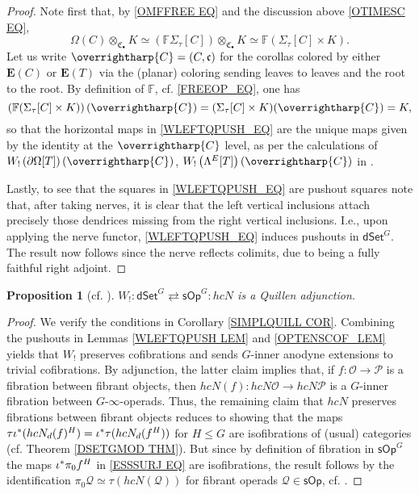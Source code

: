 \documentclass[a4paper,10pt
,draft
]{article}%
\numberwithin{equation}{section}
\numberwithin{figure}{section}
\newtheorem{proposition}[equation]{Proposition}%
\theoremstyle{definition} %
\newcommand{\vect}[1]{\text{\overrightharp{\ensuremath{#1}}}}
\newcommand{\sOp}{\ensuremath{\mathsf{sOp}}}%
\newcommand{\dSet}{\mathsf{dSet}}
\newcommand{\1}{\ensuremath{\mathbbm 1}}%
\begin{document}
\begin{proof}
Note first that, by \eqref{OMFFREE EQ} and the discussion above
\eqref{OTIMESC EQ},
	\[\Omega(C) \otimes_{\mathfrak{C}_{\bullet}} K
	\simeq
	\left(
	\mathbb{F} \Sigma_{\tau}[C]	
	\right)	\otimes_{\mathfrak{C}_{\bullet}} K
	\simeq
	\mathbb{F} (\Sigma_{\tau}[C] \times K).\]
Let us write $\vect{C} = (C,\mathfrak{c})$
for the corollas colored by either
$\boldsymbol{E}(C)$ or $\boldsymbol{E}(T)$
via the (planar) coloring sending leaves to leaves and the root to the root. By definition of $\mathbb{F}$, cf. \eqref{FREEOP_EQ},
one has
	\[
	\left(\mathbb{F} (\Sigma_{\tau}[C] \times K)\right)(\vect{C}) =
	(\Sigma_{\tau}[C] \times K)(\vect{C}) = K,
	\]
so that the horizontal maps in 
\eqref{WLEFTQPUSH_EQ}
are the unique maps given by the identity at the 
$\vect{C}$ level,
as per the calculations of
$W_!\left(\partial \Omega[T] \right)(\vect{C})$,
$W_!\left(\Lambda^E[T] \right)(\vect{C})$
in {\color{red} 
	\cite[Examples \ref{W-WPARTIALT_EX},\ref{W-WPARTIALT2_EX}]{BP_WCONS}}.

Lastly, to see that the squares in
\eqref{WLEFTQPUSH_EQ} are pushout squares note that,
after taking nerves, it is clear that the left vertical inclusions attach precisely those dendrices 
missing from the right vertical inclusions.
I.e., upon applying the nerve functor, \eqref{WLEFTQPUSH_EQ}
induces pushouts in $\mathsf{dSet}^G$.
The result now follows since the nerve reflects colimits,
due to being a fully faithful right adjoint.
\end{proof}



\begin{proposition}[{cf. \cite[Prop. 4.9]{CM13b}}]
      \label{W!_LEFTQ_PROP}
      $W_! \colon \dSet^G \rightleftarrows \sOp^G\colon hcN$
      is a Quillen adjunction.
\end{proposition}

\begin{proof}
	We verify the conditions in Corollary \ref{SIMPLQUILL COR}.
	Combining the pushouts in 
	Lemmas \ref{WLEFTQPUSH LEM} and \ref{OPTENSCOF_LEM}
	yields that 
	$W_!$ preserves cofibrations
	and sends $G$-inner anodyne extensions to trivial cofibrations.
	By adjunction,
	the latter claim implies that,
	if $f\colon \mathcal{O} \to \mathcal{P}$ is a fibration between fibrant objects,
	then 
	$hcN (f)\colon hcN \mathcal{O} \to hcN\mathcal{P}$
	is a $G$-inner fibration between $G$-$\infty$-operads.
	Thus, the remaining claim that 
	$hcN$ preserves fibrations between fibrant objects
	reduces to showing that the maps
	$\tau \iota^{\**} (h c N_d(f)^H) = \iota^{\**} \tau (h c N_d(f^H))$
	for $H \leq G$
	are isofibrations of (usual) categories
	(cf. Theorem \ref{DSETGMOD THM}).
%	
	But since by definition 
	of fibration in $\mathsf{sOp}^G$
	the maps $\iota^{\**} \pi_0 f^H$ in \eqref{ESSSURJ EQ}
	are isofibrations,
	the result follows by the identification
	$\pi_0 \mathcal{Q} \simeq 
	\tau \left(h c N (\mathcal{Q}) \right)$ for fibrant operads $\mathcal{Q} \in \mathsf{sOp}$,
	cf. \cite[Prop. 4.8]{CM13b}.
\end{proof}
\end{document}
